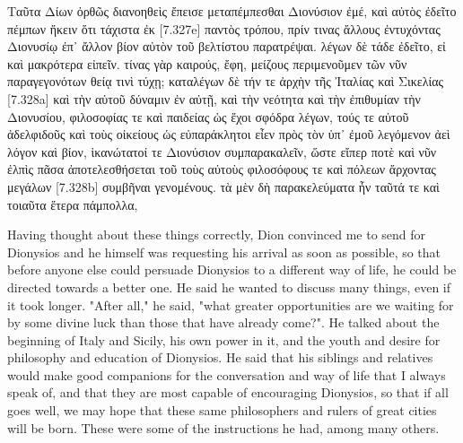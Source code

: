 \documentclass[12pt]{book}
\begin{document}
\begin{pairs}
\begin{Rightside}
\begin{Ancient Greek}
\beginnumbering
\pstart
Ταῦτα Δίων ὀρθῶς διανοηθεὶς ἔπεισε μεταπέμπεσθαι Διονύσιον ἐμέ, καὶ αὐτὸς ἐδεῖτο πέμπων ἥκειν ὅτι τάχιστα ἐκ [7.327e] παντὸς τρόπου, πρίν τινας ἄλλους ἐντυχόντας Διονυσίῳ ἐπ᾽ ἄλλον βίον αὐτὸν τοῦ βελτίστου παρατρέψαι. λέγων δὲ τάδε ἐδεῖτο, εἰ καὶ μακρότερα εἰπεῖν. τίνας γὰρ καιρούς, ἔφη, μείζους περιμενοῦμεν τῶν νῦν παραγεγονότων θείᾳ τινὶ τύχῃ; καταλέγων δὲ τήν τε ἀρχὴν τῆς Ἰταλίας καὶ Σικελίας [7.328a] καὶ τὴν αὑτοῦ δύναμιν ἐν αὐτῇ, καὶ τὴν νεότητα καὶ τὴν ἐπιθυμίαν τὴν Διονυσίου, φιλοσοφίας τε καὶ παιδείας ὡς ἔχοι σφόδρα λέγων, τούς τε αὑτοῦ ἀδελφιδοῦς καὶ τοὺς οἰκείους ὡς εὐπαράκλητοι εἶεν πρὸς τὸν ὑπ᾽ ἐμοῦ λεγόμενον ἀεὶ λόγον καὶ βίον, ἱκανώτατοί τε Διονύσιον συμπαρακαλεῖν, ὥστε εἴπερ ποτὲ καὶ νῦν ἐλπὶς πᾶσα ἀποτελεσθήσεται τοῦ τοὺς αὐτοὺς φιλοσόφους τε καὶ πόλεων ἄρχοντας μεγάλων [7.328b] συμβῆναι γενομένους. τὰ μὲν δὴ παρακελεύματα ἦν ταῦτά τε καὶ τοιαῦτα ἕτερα πάμπολλα,	
\pend
\endnumbering
\end{Ancient Greek}
\end{Rightside}
\begin{Leftside}
\begin{English}
\beginnumbering
\pstart
Having thought about these things correctly, Dion convinced me to send for Dionysios and he himself was requesting his arrival as soon as possible, so that before anyone else could persuade Dionysios to a different way of life, he could be directed towards a better one. He said he wanted to discuss many things, even if it took longer. "After all," he said, "what greater opportunities are we waiting for by some divine luck than those that have already come?". He talked about the beginning of Italy and Sicily, his own power in it, and the youth and desire for philosophy and education of Dionysios. He said that his siblings and relatives would make good companions for the conversation and way of life that I always speak of, and that they are most capable of encouraging Dionysios, so that if all goes well, we may hope that these same philosophers and rulers of great cities will be born. These were some of the instructions he had, among many others.
\pend
\endnumbering
\end{English}
\end{Leftside}
\end{pairs}
\Columns
\end{document}
